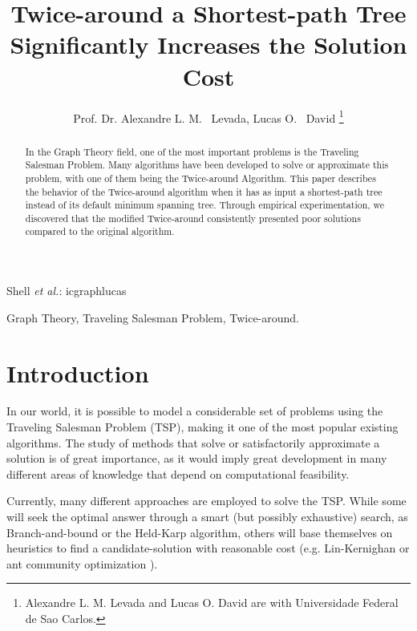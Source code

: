 \documentclass[journal]{IEEEtran}
\begin{document}
\title{Twice-around a Shortest-path Tree Significantly Increases the Solution Cost}

\author{Prof. Dr. Alexandre L. M. ~Levada,
	Lucas O. ~David
\thanks{Alexandre L. M. Levada and Lucas O. David are with Universidade Federal de Sao Carlos.}
}

\markboth{\today}%
{Shell \MakeLowercase{\textit{et al.}}: icgraphlucas}

\maketitle

\begin{abstract}

In the Graph Theory field, one of the most important problems is the Traveling Salesman Problem. Many algorithms have been developed to solve or approximate this problem, with one of them being the Twice-around Algorithm. This paper describes the behavior of the Twice-around algorithm when it has as input a shortest-path tree instead of its default minimum spanning tree. Through empirical experimentation, we discovered that the modified Twice-around consistently presented poor solutions compared to the original algorithm.

\end{abstract}

\begin{IEEEkeywords}
	Graph Theory, Traveling Salesman Problem, Twice-around.
\end{IEEEkeywords}

\section{Introduction}

In our world, it is possible to model a considerable set of problems using the Traveling Salesman Problem (TSP), making it one of the most popular existing algorithms. The study of methods that solve or satisfactorily approximate a solution is of great importance, as it would imply great development in many different areas of knowledge that depend on computational feasibility.

Currently, many different approaches are employed to solve the TSP. While some will seek the optimal answer through a smart (but possibly exhaustive) search, as Branch-and-bound or the Held-Karp algorithm, others will base themselves on heuristics to find a candidate-solution with reasonable cost (e.g. Lin-Kernighan or ant community optimization \cite{soricone}).
\end{document}
